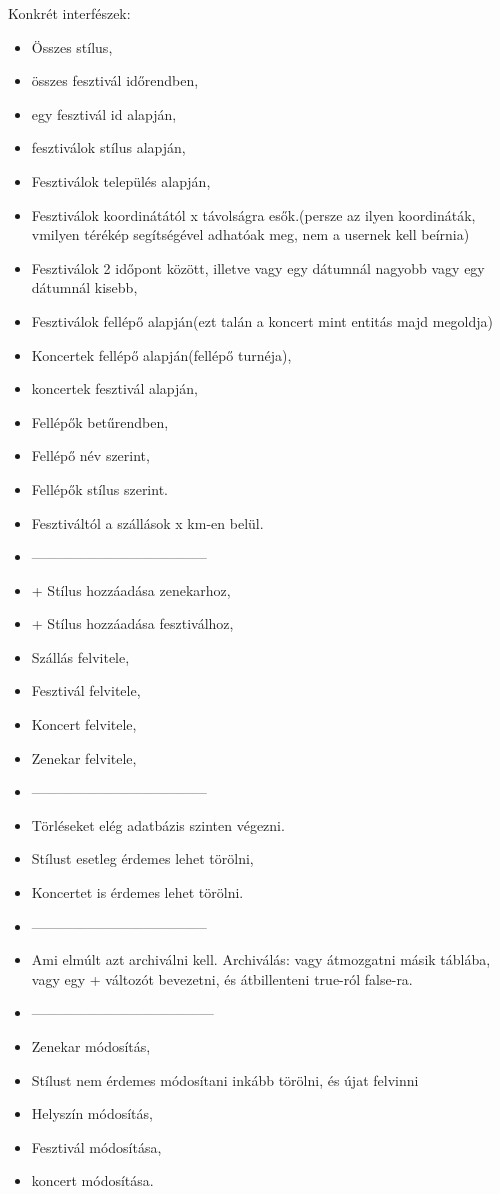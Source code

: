 \documentclass[11pt]{article}
\begin{document}
Konkrét interfészek:
\begin{itemize}
\item Összes stílus,
\item összes fesztivál időrendben,
\item egy fesztivál id alapján,
\item fesztiválok stílus alapján,
\item Fesztiválok település alapján,
\item Fesztiválok koordinátától x távolságra esők.(persze az ilyen koordináták, vmilyen térékép segítségével adhatóak meg, nem a usernek kell beírnia)
\item Fesztiválok 2 időpont között, illetve vagy egy dátumnál nagyobb vagy egy dátumnál kisebb,
\item Fesztiválok fellépő alapján(ezt talán a koncert mint entitás majd megoldja)
\item Koncertek fellépő alapján(fellépő turnéja),
\item koncertek fesztivál alapján,
\item Fellépők betűrendben,
\item Fellépő név szerint,
\item Fellépők stílus szerint.
\item Fesztiváltól a szállások x km-en belül.
\item --------------------------------------
\item + Stílus hozzáadása zenekarhoz, 
\item + Stílus hozzáadása fesztiválhoz,
\item Szállás felvitele,
\item Fesztivál felvitele,
\item Koncert felvitele,
\item Zenekar felvitele,
\item --------------------------------------
\item Törléseket elég adatbázis szinten végezni.
\item Stílust esetleg érdemes lehet törölni,
\item Koncertet is érdemes lehet törölni.
\item --------------------------------------
\item Ami elmúlt azt archiválni kell. Archiválás: vagy átmozgatni másik táblába, vagy egy + változót bevezetni, és átbillenteni true-ról false-ra.
\item ---------------------------------------
\item Zenekar módosítás,
\item Stílust nem érdemes módosítani inkább törölni, és újat felvinni
\item Helyszín módosítás,
\item Fesztivál módosítása, 
\item koncert módosítása.
\end{itemize}
\end{document}
